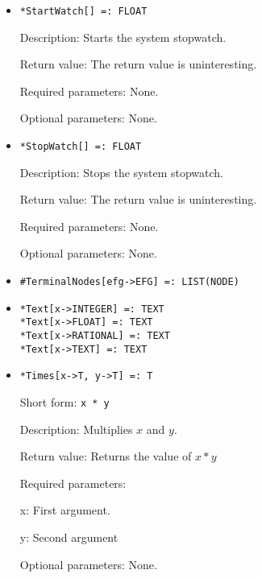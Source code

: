\begin{itemize}
\item

\protect \large \begin{verbatim}
*StartWatch[] =: FLOAT
\end{verbatim}\normalsize

\bd
\item
[Description:] Starts the system stopwatch.
\item
[Return value:] The return value is uninteresting.
\item
[Required parameters:] None.
\item
[Optional parameters:] None.
\ed

\item
\protect \large \begin{verbatim}
*StopWatch[] =: FLOAT
\end{verbatim}\normalsize

\bd
\item
[Description:] Stops the system stopwatch.
\item
[Return value:] The return value is uninteresting.
\item
[Required parameters:] None.
\item
[Optional parameters:] None.
\ed


\item
\protect \large \begin{verbatim} 
#TerminalNodes[efg->EFG] =: LIST(NODE)
\end{verbatim}\normalsize

\item
\protect \large \begin{verbatim}
*Text[x->INTEGER] =: TEXT
*Text[x->FLOAT] =: TEXT
*Text[x->RATIONAL] =: TEXT
*Text[x->TEXT] =: TEXT
\end{verbatim} \normalsize

\item 
\protect \large \begin{verbatim}
*Times[x->T, y->T] =: T
\end{verbatim} \normalsize
  
\bd
\item
[Short form:] \verb+x * y+
\item
[Description:] Multiplies $x$ and $y$.
\item
[Return value:] Returns the value of $x * y$  
\item
[Required parameters:]\hfil\null
\bd
\item
[x:] First argument.  
\item
[y:] Second argument
\ed
\item
[Optional parameters:] None.
\ed


\end{itemize}
